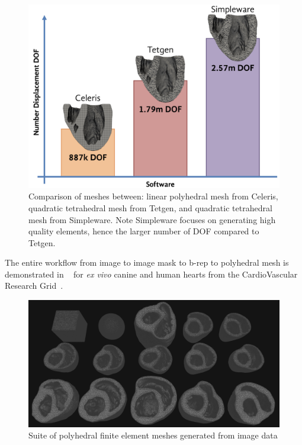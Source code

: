 \begin{figure}[ht!]
\centering
		\includegraphics[scale=0.2]{media/comparison.png}
%
\caption{Comparison of meshes between: linear polyhedral mesh from Celeris, quadratic tetrahedral mesh from Tetgen, and quadratic tetrahedral mesh from Simpleware. Note Simpleware focuses on generating high quality elements, hence the larger number of DOF compared to Tetgen.}
\label{fig:comp}
\end{figure}

The entire workflow from image to image mask to b-rep to polyhedral mesh is demonstrated in ~ for \textit{ex vivo} canine and human hearts from the CardioVascular Research Grid~\cite{cvgg}.

\begin{figure}[htbp!]
\centering
\includegraphics[width=1.0\textwidth]{media/3-celeris/7-suite.png}
\caption{Suite of polyhedral finite element meshes generated from image data \vspace{1cm}}
\label{fig:celsuite}
\end{figure}

